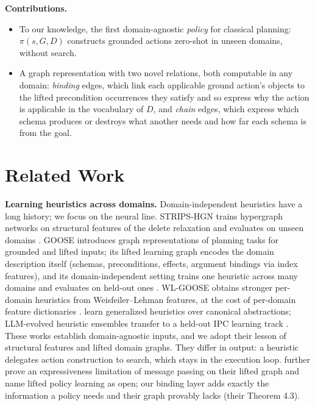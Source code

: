 \documentclass[letterpaper]{article} %
\begin{document}
\textbf{Contributions.}
\begin{itemize}
\item To our knowledge, the first domain-agnostic \emph{policy} for
  classical planning: $\pi(s, G, D)$ constructs grounded actions zero-shot
  in unseen domains, without search.
\item A graph representation with two novel relations, both computable in
  any domain: \emph{binding} edges, which link each applicable ground
  action's objects to the lifted precondition occurrences they satisfy and
  so express why the action is applicable in the vocabulary of $D$, and \emph{chain} edges,
  which express which schema produces or destroys what another needs and
  how far each schema is from the goal.
\end{itemize}

\section{Related Work}


\textbf{Learning heuristics across domains.} Domain-independent heuristics
have a long history; we focus on the neural line. STRIPS-HGN trains
hypergraph networks on structural features of the delete relaxation and
evaluates on unseen domains \citep{strips_hgn}. GOOSE introduces graph
representations of planning tasks for grounded and lifted inputs; its
lifted learning graph encodes the domain description itself (schemas,
preconditions, effects, argument bindings via index features), and its
domain-independent setting trains one heuristic across many domains and
evaluates on held-out ones \citep{goose_v1, goose_v2}. WL-GOOSE obtains
stronger per-domain heuristics from Weisfeiler--Lehman features, at the
cost of per-domain feature dictionaries \citep{wl_goose}.
\citet{karia2021learning} learn generalized heuristics over canonical
abstractions; LLM-evolved heuristic ensembles transfer to a held-out IPC
learning track \citep{llm_evolved_heuristics_2026}. These works establish
domain-agnostic inputs, and we adopt their lesson of structural features
and lifted domain graphs. They differ in output: a heuristic delegates
action construction to search, which stays in the execution loop.
\citet{goose_v2} further prove an expressiveness limitation of message
passing on their lifted graph and name lifted policy learning as open; our
binding layer adds exactly the information a policy needs and their graph
provably lacks (their Theorem 4.3).
\end{document}

